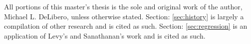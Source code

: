 All portions of this master's thesis is the sole and original work of the author, Michael L. DeLibero, unless otherwise stated. Section: \ref{sec:history}  is largely a compilation of other research and is cited as such. Section: \ref{sec:regression}  is an application of Levy's\cite{levy} and Sanathanan's\cite{levy_iter} work and is cited as such.

